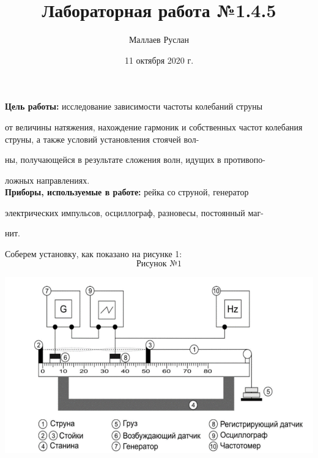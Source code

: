 \documentclass[a4paper,12pt]{article} %
\author{Маллаев Руслан}
\title{Лабораторная работа №1.4.5}
\date{11 октября 2020 г.}
\begin{document}

\maketitle
\newpage
 
 \textbf{Цель работы:} исследование зависимости частоты колебаний струны 
 
 от величины натяжения, нахождение гармоник и собственных частот колебания струны, а также условий установления стоячей вол-
 
 ны, получающейся в результате сложения волн, идущих в противопо-
 
 ложных направлениях.\\

\textbf{Приборы, используемые в работе:} рейка со струной, генератор 

электрических импульсов, осциллограф, разновесы, постоянный маг-

нит.

Соберем установку, как показано на рисунке 1:
\[\text{Рисунок №1}\]
\begin{center}
\includegraphics[scale=0.6]{схема}
\end{center}

\newpage
\end{document}
